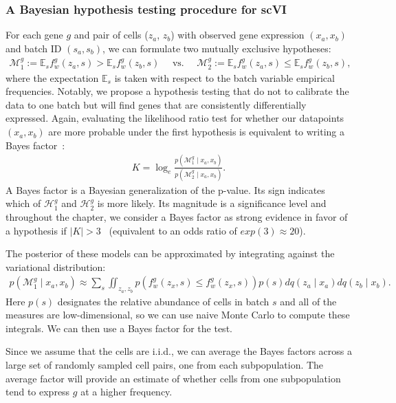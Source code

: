 \subsubsection{A Bayesian hypothesis testing procedure for scVI}
For each gene $g$ and pair of cells ($z_a$, $z_b$) with observed gene expression $(x_a, x_b)$ and batch ID $(s_a, s_b)$, we can formulate two mutually exclusive hypotheses:
\begin{align}
    \mathcal{M}_1^g:= \mathbb{E}_sf_w^g(z_a, s) > \mathbb{E}_sf_w^g(z_b, s) \textrm{~~~~vs.~~~~} \mathcal{M}_2^g:=\mathbb{E}_sf_w^g(z_a, s) \leq \mathbb{E}_sf_w^g(z_b, s),
\end{align}
where the expectation $\mathbb{E}_s$ is taken with respect to the batch variable empirical frequencies. Notably, we propose a hypothesis testing that do not to calibrate the data to one batch but will find genes that are consistently differentially expressed. 
Again, evaluating the likelihood ratio test for whether our datapoints $(x_a, x_b)$ are more probable under the first hypothesis is equivalent to writing a Bayes factor~\cite{doi:10.1146/annurev-statistics-031017-100307}:
\begin{align}
K = \log_e \frac{p(\mathcal{M}_1^g \mid x_a, x_b)}{p(\mathcal{M}_2^g \mid x_a, x_b)}.
\end{align}
A Bayes factor is a Bayesian generalization of the p-value. Its sign indicates which of $\mathcal{H}_1^g$ and $\mathcal{H}_2^g$ is more likely. Its magnitude is a significance level and throughout the chapter, we consider a Bayes factor as strong evidence in favor of a hypothesis if $|K| > 3$~\cite{Kass1995} (equivalent to an odds ratio of $exp(3)\approx 20$).

The posterior of these models can be approximated by integrating against the variational distribution:
\begin{align}
p(\mathcal{M}_1^g \mid x_a, x_b) \approx \sum_s\iint_{z_a, z_b} p(f_w^g(z_x, s) \leq f_w^g(z_x, s) )p(s)dq(z_a \mid x_a)dq(z_b \mid x_b).
\end{align}
Here $p(s)$ designates the relative abundance of cells in batch $s$ and all of the measures are low-dimensional, so we can use naive Monte Carlo to compute these integrals. We can then use a Bayes factor for the test.

Since we assume that the cells are i.i.d., we can average the Bayes factors across a large set of randomly sampled cell pairs, one from each subpopulation. The average factor will provide an estimate of whether cells from one subpopulation tend to express $g$ at a higher frequency. 


